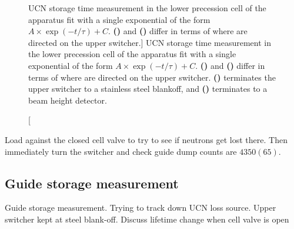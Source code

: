 \begin{figure}
\begin{subfigure}{.5\textwidth}
  \caption{}\label{subfig:2022_storage_beam_height_det}
\end{subfigure}
\caption
    [UCN storage time measurement in the lower precession cell of the apparatus fit with a single exponential of the form $A \times \exp(-t/\tau) + C$. \textbf{()} and \textbf{()} differ in terms of where \ucn are directed on the upper switcher.]
    {UCN storage time measurement in the lower precession cell of the apparatus fit with a single exponential of the form $A \times \exp(-t/\tau) + C$. \textbf{()} and \textbf{()} differ in terms of where \ucn are directed on the upper switcher. \textbf{()} terminates the upper switcher to a stainless steel blankoff, and \textbf{()} terminates to a beam height \BZnS \ucn detector.}
\label{fig:2022_ucn_storage}
\end{figure}

Load against the closed cell valve to try to see if neutrons get lost there. Then immediately turn the switcher and check guide dump counts are $4350(65)$.


\subsection{Guide storage measurement}\label{sec:guide_storage_measurement}


Guide storage measurement. Trying to track down UCN loss source.  Upper switcher kept at steel blank-off. Discuss lifetime change when cell valve is open

